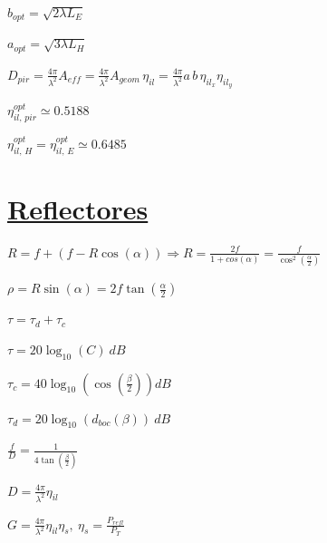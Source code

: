 \documentclass[twocolumn, 8pt]{extarticle}
\begin{document}
\vspace{0.5cm}
\( b_{opt} = \sqrt{ 2\lambda L_E } \)

\vspace{0.5cm}
\( a_{opt} = \sqrt{ 3\lambda L_H } \)

\vspace{0.5cm}
\( D_{pir} = \frac{ 4\pi }{ \lambda^2 } A_{eff} = \frac{ 4\pi }{ \lambda^2 } A_{geom} \, \eta_{il} = \frac{ 4\pi }{ \lambda^2 } a \, b \, \eta_{il_x} \eta_{il_y} \)

\vspace{0.5cm}
\( \eta^{opt}_{il ,\, pir} \simeq 0.5188 \)

\vspace{0.5cm}
\( \eta^{opt}_{il ,\, H} =  \eta^{opt}_{il ,\, E} \simeq 0.6485 \)

\vspace{0.5cm}
\section*{\underline{Reflectores}}

\( R = f + (f - R\cos(\alpha)) \Rightarrow R = \frac{2f}{1 + cos(\alpha)} = \frac{f}{\cos^2\left(\frac{\alpha}{2}\right)}\)

\vspace{0.5cm}
\( \rho = R \sin(\alpha) = 2f \tan\left(\frac{\alpha}{2}\right) \)

\vspace{0.5cm}
\( \tau = \tau_d + \tau_c\)

\vspace{0.5cm}
\( \tau = 20\log_{10}(C)\ dB \)

\vspace{0.5cm}
\( \tau_c = 40\log_{10}\left(\cos\left(\frac{\beta}{2}\right)\right) dB \)

\vspace{0.5cm}
\( \tau_d = 20\log_{10}(d_{boc}(\beta))\ dB \)

\vspace{0.5cm}
\( \frac{f}{D} = \frac{1}{4\tan\left(\frac{\beta}{2}\right)} \)

\vspace{0.5cm}
\( D = \frac{4\pi}{\lambda^2} \eta_{il} \)

\vspace{0.5cm}
\( G = \frac{4\pi}{\lambda^2} \eta_{il} \eta_{s},\ \eta_{s} = \frac{P_{refl}}{P_T} \)
\end{document}
